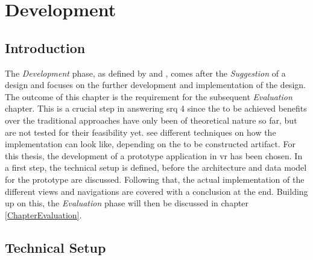 
\chapter{Development}

\label{ChapterDevelopment}


\section{Introduction}

The \textit{Development} phase, as defined by \cite{Vaishnavi2008} and \cite{Hevner2010}, comes after the \textit{Suggestion} of a design and focuses on the further development and implementation of the design. The outcome of this chapter is the requirement for the subsequent \textit{Evaluation} chapter. This is a crucial step in answering \gls{srq} 4 since the to be achieved benefits over the traditional approaches have only been of theoretical nature so far, but are not tested for their feasibility yet. \cite{Vaishnavi2008} see different techniques on how the implementation can look like, depending on the to be constructed artifact. For this thesis, the development of a prototype application in \gls{vr} has been chosen. In a first step, the technical setup is defined, before the architecture and data model for the prototype are discussed. Following that, the actual implementation of the different views and navigations are covered with a conclusion at the end. \newline
Building up on this, the \textit{Evaluation} phase will then be discussed in chapter \ref{ChapterEvaluation}.



\section{Technical Setup}

